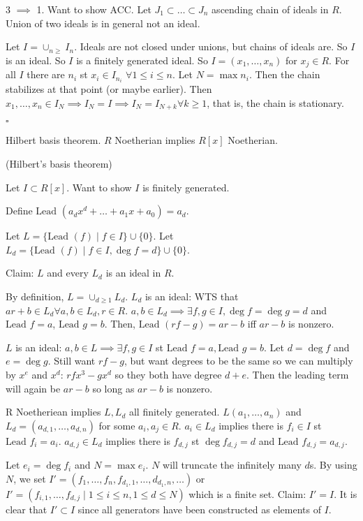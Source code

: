 \documentclass{./template}
\newcommand{\Lead}{\textrm{Lead }}
\begin{document}
{{  3 $\implies$ 1. Want to show ACC. Let $J_1\subset\ldots\subset J_n$ ascending chain of ideals in $R$. Union of two ideals is in general not an ideal.

  Let $I=\cup_{n\geq} I_n$. Ideals are not closed under unions, but chains of ideals are. So $I$ is an ideal. So $I$ is a finitely generated ideal. So $I=(x_1,\ldots,x_n)$ for $x_j\in R$. For all $I$ there are $n_i$ st $x_i \in I_{n_i}$ $\forall 1\leq i \leq n$. Let $N=\max n_i$. Then the chain stabilizes at that point (or maybe earlier). Then $x_1,\ldots,x_n\in I_N \implies I_N=I \implies I_N=I_{N+k} \forall k\geq 1$, that is, the chain is stationary.

  $\square$
  
  }

  {\thm Hilbert basis theorem. $R$ Noetherian implies $R[x]$ Noetherian.}

  {\proof (Hilbert's basis theorem)
  
  Let $I \subset R[x]$. Want to show $I$ is finitely generated.

  Define $\Lead(a_dx^d+\ldots+a_1x+a_0)=a_d$.

  Let $L=\{\Lead(f) \mid f\in I\}\cup\{0\}$. Let $L_d=\{\Lead(f)\mid f\in I, \deg f = d\}\cup\{0\}$.

  Claim: $L$ and every $L_d$ is an ideal in $R$.

  By definition, $L=\cup_{d\geq 1} L_d$. $L_d$ is an ideal: WTS that $ar+b\in L_d \forall a,b\in L_d, r\in R$. $a,b\in L_d \implies \exists f,g \in I, \deg f = \deg g = d$ and $\Lead f = a$, $\Lead g = b$. Then, $\Lead (rf-g)=ar-b$ iff $ar-b$ is nonzero.

  $L$ is an ideal: $a,b\in L \implies \exists f,g\in I$ st $\Lead f = a, \Lead g =b $. Let $d=\deg f$ and $e=\deg g$. Still want $rf-g$, but want degrees to be the same so we can multiply by $x^e$ and $x^d$: $rfx^3-gx^d$ so they both have degree $d+e$. Then the leading term will again be $ar-b$ so long as $ar-b$ is nonzero.

  \hrulefill

  R Noetheriean implies $L, L_d$ all finitely generated. $L(a_1,\ldots,a_n)$
   and $L_d=(a_{d,1},\ldots,a_{d,n})$ for some $a_i,a_j \in R$. $a_i\in L_d$ implies there is $f_i\in I$ st $\Lead f_i=a_i$. $a_{d,j} \in L_d$ implies there is $f_{d,j}$ st $\deg f_{d,j}=d$ and $\Lead f_{d,j}=a_{d,j}$.

   Let $e_i=\deg f_i$ and $N=\max e_i$. $N$ will truncate the infinitely many $d$s. By using $N$, we set $I'=(f_1,\ldots,f_n,f_{d_1,1},\ldots,d_{d_1,n}, \ldots)$ or $I'=(f_{i,1},\ldots, f_{d,j} \mid 1\leq i \leq n, 1 \leq d \leq N)$ which is a finite set. Claim: $I'=I$. It is clear that $I'\subset I$ since all generators have been constructed as elements of $I$.

}}
\end{document}
